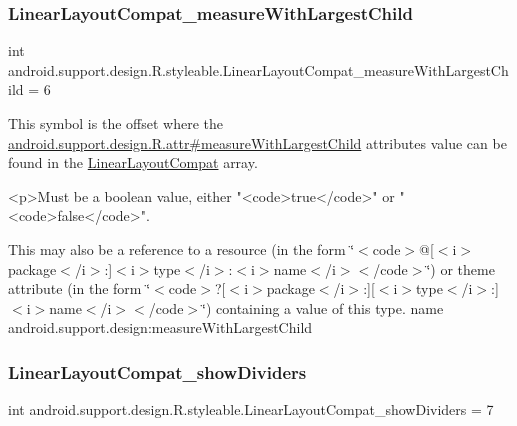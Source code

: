 \subsubsection{\texorpdfstring{Linear\+Layout\+Compat\+\_\+measure\+With\+Largest\+Child}{LinearLayoutCompat\_measureWithLargestChild}}
{\footnotesize\ttfamily int android.\+support.\+design.\+R.\+styleable.\+Linear\+Layout\+Compat\+\_\+measure\+With\+Largest\+Child = 6\hspace{0.3cm}{\ttfamily [static]}}

This symbol is the offset where the \hyperlink{classandroid_1_1support_1_1design_1_1R_1_1attr_a5d0f510b241b8f09434fcd2298352dcf}{android.\+support.\+design.\+R.\+attr\#measure\+With\+Largest\+Child} attribute\textquotesingle{}s value can be found in the \hyperlink{classandroid_1_1support_1_1design_1_1R_1_1styleable_a00b7e2da5bc1f659d80ac76716119713}{Linear\+Layout\+Compat} array.

\begin{DoxyVerb}      <p>Must be a boolean value, either "<code>true</code>" or "<code>false</code>".
\end{DoxyVerb}
 

This may also be a reference to a resource (in the form \char`\"{}$<$code$>$@\mbox{[}$<$i$>$package$<$/i$>$\+:\mbox{]}$<$i$>$type$<$/i$>$\+:$<$i$>$name$<$/i$>$$<$/code$>$\char`\"{}) or theme attribute (in the form \char`\"{}$<$code$>$?\mbox{[}$<$i$>$package$<$/i$>$\+:\mbox{]}\mbox{[}$<$i$>$type$<$/i$>$\+:\mbox{]}$<$i$>$name$<$/i$>$$<$/code$>$\char`\"{}) containing a value of this type.  name android.\+support.\+design\+:measure\+With\+Largest\+Child \mbox{\label{classandroid_1_1support_1_1design_1_1R_1_1styleable_af92c8ae01241fac2f25cd795b2d750aa}} 
\subsubsection{\texorpdfstring{Linear\+Layout\+Compat\+\_\+show\+Dividers}{LinearLayoutCompat\_showDividers}}
{\footnotesize\ttfamily int android.\+support.\+design.\+R.\+styleable.\+Linear\+Layout\+Compat\+\_\+show\+Dividers = 7\hspace{0.3cm}{\ttfamily [static]}}

